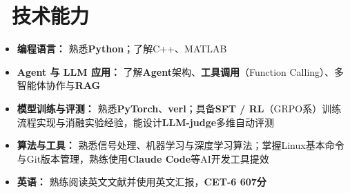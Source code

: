 \section{\makebox[\widthof{\faCogs}][c]{\color{CVBlue}\faCogs}\ 技术能力}
\begin{itemize}[nosep]
    \item \textbf{编程语言：} 熟悉\textbf{Python}；了解C++、MATLAB
    \item \textbf{Agent 与 LLM 应用：} 了解\textbf{Agent}架构、\textbf{工具调用}（Function Calling）、多智能体协作与\textbf{RAG}
    \item \textbf{模型训练与评测：} 熟悉\textbf{PyTorch}、\textbf{verl}；具备\textbf{SFT / RL}（GRPO系）训练流程实现与消融实验经验，能设计\textbf{LLM-judge}多维自动评测
    \item \textbf{算法与工具：} 熟悉信号处理、机器学习与深度学习算法；掌握Linux基本命令与Git版本管理，熟练使用\textbf{Claude Code}等AI开发工具提效
    \item \textbf{英语：} 熟练阅读英文文献并使用英文汇报，\textbf{CET-6 607分}
\end{itemize}
